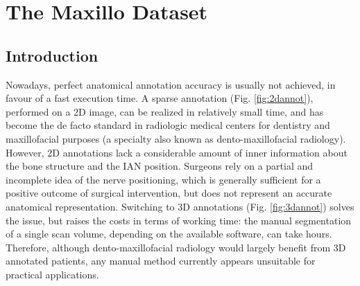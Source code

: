 
\chapter{The Maxillo Dataset}

\label{chp:maxillo}

\def\:{\hskip0pt} %

\section{Introduction}
Nowadays, perfect anatomical annotation accuracy is usually not achieved, in
favour of a fast execution time. A sparse annotation (Fig. \ref{fig:2dannot}),
performed on a 2D image, can be realized in relatively small time, and has
become the de facto standard in radiologic medical centers for dentistry and
maxillofacial purposes (a specialty also known as dento-maxillofacial
radiology). However, 2D annotations lack a considerable amount of inner
information about the bone structure and the IAN position. Surgeons rely on a
partial and incomplete idea of the nerve positioning, which is generally
sufficient for a positive outcome of surgical intervention, but does not
represent an accurate anatomical representation. Switching to 3D annotations
(Fig. \ref{fig:3dannot}) solves the issue, but raises the costs in terms of
working time: the manual segmentation of a single scan volume, depending on the
available software, can take hours. Therefore, although dento-maxillofacial
radiology would largely benefit from 3D annotated patients, any manual method
currently appears unsuitable for practical applications.

